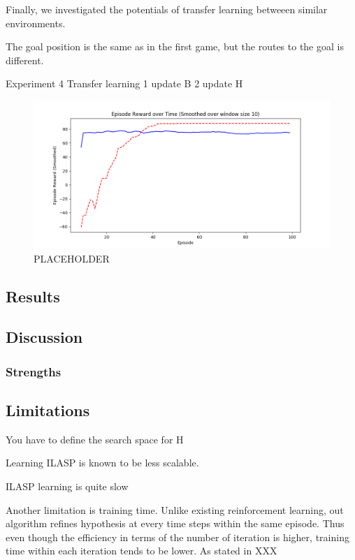 Finally, we investigated the potentials of transfer learning betweeen similar environments. 

The goal position is the same as in the first game, but the routes to the goal is different. 

Experiment 4 Transfer learning 
    1 update B
    2 update H


\begin{figure}[!htb]
\centering
\includegraphics[width=1.0\textwidth]{./figures/placeholder}
\caption{PLACEHOLDER}
\label{proposed_architecture}
\end{figure}


\subsection{Results}

\subsection{Discussion}
\subsubsection{Strengths}

\subsection{Limitations}

You have to define the search space for H

Learning ILASP is known to be less scalable. 

ILASP learning is quite slow

Another limitation is training time. Unlike existing reinforcement learning, 
out algorithm refines hypothesis at every time steps within the same episode. 
Thus even though the efficiency in terms of the number of iteration is higher, 
training time within each iteration tends to be lower. 
As stated in XXX